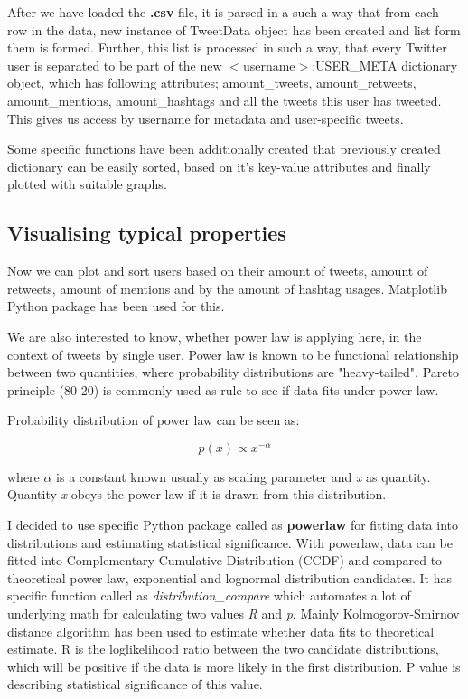 After we have loaded the \textbf{.csv} file, it is parsed in a such a way that from each row in the data, new instance
of TweetData object has been created and list form them is formed.
Further, this list is processed in such a way, that every Twitter user is separated to be part of the new
$<$username$>$:USER\_META dictionary object, which has following attributes; amount\_tweets, amount\_retweets, amount\_mentions, amount\_hashtags and all the tweets this user has tweeted.
This gives us access by username for metadata and user-specific tweets.

Some specific functions have been additionally created that previously created dictionary can be easily sorted, based on it's key-value attributes and finally plotted with suitable graphs.

\subsection{Visualising typical properties}

Now we can plot and sort users based on their amount of tweets, amount of retweets, amount of mentions and by the amount of hashtag usages.
Matplotlib Python package has been used for this.

We are also interested to know, whether power law is applying here, in the context of tweets by single user.
Power law is known to be functional relationship between two quantities, where probability distributions are  "heavy-tailed".
Pareto principle (80-20) is commonly used as rule to see if data fits under power law\cite{enwiki:1023956740}.

Probability distribution of power law can be seen as:

\begin{equation}
    p(x) \propto x^{-\alpha}\label{eq:equation1}
\end{equation}

where $\alpha$ is a constant known usually as scaling parameter and \textit{x} as quantity.
Quantity \textit{x} obeys the power law if it is drawn from this distribution.\cite{doi:10.1137/070710111}

I decided to use specific Python package called as \textbf{powerlaw}\cite{Alstott_2014} for fitting data into distributions and estimating statistical significance.
With powerlaw, data can be fitted into Complementary Cumulative Distribution (CCDF) and compared to theoretical power law, exponential and lognormal distribution candidates.
It has specific function called as \textit{distribution\_compare} which automates a lot of underlying math for calculating two values \textit{R} and \textit{p}.
Mainly Kolmogorov-Smirnov distance algorithm has been used to estimate whether data fits to theoretical estimate.
R is the loglikelihood ratio between the two candidate distributions, which will be positive if the data is more likely in the first distribution.
P value is describing statistical significance of this value.


